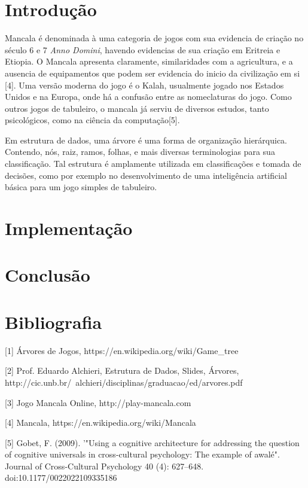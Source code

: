 \documentclass[a4paper, 12pt]{article}
\begin{document}
	
	\section{Introdução}
		\textrm{Mancala é denominada à uma categoria de jogos com sua evidencia de criação no século 6 e 7 \emph{Anno Domini}, havendo evidencias de sua criação em Eritreia e Etiopia. O Mancala apresenta claramente, similaridades com a agricultura, e a ausencia de equipamentos que podem ser evidencia do inicio da civilização em si [4]. Uma versão moderna do jogo é o Kalah, usualmente jogado nos Estados Unidos e na Europa, onde há a confusão entre as nomeclaturas do jogo. Como outros jogos de tabuleiro, o mancala já serviu de diversos estudos, tanto psicológicos, como na ciência da computação[5].}
	
		\textrm{Em estrutura de dados, uma árvore é uma forma de organização hierárquica. Contendo, nós, raiz, ramos, folhas, e mais diversas terminologias para sua classificação. Tal estrutura é amplamente utilizada em classificações e tomada de decisões, como por exemplo no desenvolvimento de uma inteligência artificial básica para um jogo simples de tabuleiro.}
		
	\section{Implementação}
		\textrm{}
		

	\section{Conclusão}
		\textrm{}
		
	\section{Bibliografia}
	    [1] Árvores de Jogos, https://en.wikipedia.org/wiki/Game_tree
	
		[2] Prof. Eduardo Alchieri, Estrutura de Dados, Slides, Árvores, http://cic.unb.br/~alchieri/disciplinas/graduacao/ed/arvores.pdf 
		
		[3] Jogo Mancala Online, http://play-mancala.com
		
		[4] Mancala, https://en.wikipedia.org/wiki/Mancala
	
		[5] Gobet, F. (2009). '"Using a cognitive architecture for addressing the question of cognitive universals in cross-cultural psychology: The example of awalé". Journal of Cross-Cultural Psychology 40 (4): 627–648. doi:10.1177/0022022109335186
		
		
		
\end{document}
